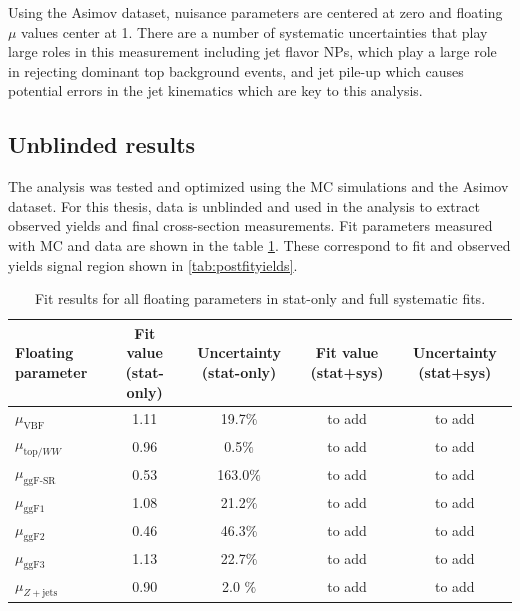 Using the Asimov dataset, nuisance parameters are centered at zero and floating $\mu$ values center at 1. There are a number of systematic uncertainties that play large roles in this measurement including jet flavor NPs, which play a large role in rejecting dominant top background events, and jet pile-up which causes potential errors in the jet kinematics which are key to this analysis.

\subsection{Unblinded results}

The analysis was tested and optimized using the MC simulations and the Asimov dataset. For this thesis, data is unblinded and used in the analysis to extract observed yields and final cross-section measurements. Fit parameters measured with MC and data are shown in the table \ref{tab:datamuresults}. These correspond to fit and observed yields signal region shown in \ref{tab:postfityields}.

\begin{table}[!h]
  \begin{center}
    \begin{tabular}{l|c|c|c|c|}
       Floating parameter & Fit value (stat-only) & Uncertainty (stat-only)    & Fit value (stat+sys) & Uncertainty (stat+sys) \\
      \hline
       $\mu_{\text{VBF}}$ & 1.11 & 19.7$\%$ & to add & to add\\
       $\mu_{\text{top/}WW}$ & 0.96 & 0.5$\%$ & to add & to add\\
       $\mu_{\text{ggF-SR}}$ & 0.53 & 163.0$\%$ & to add & to add \\
       $\mu_{\text{ggF1}}$ & 1.08 & 21.2$\%$ & to add & to add \\
       $\mu_{\text{ggF2}}$ & 0.46 & 46.3$\%$ & to add & to add \\
       $\mu_{\text{ggF3}}$ & 1.13 & 22.7$\%$ & to add & to add \\
       $\mu_{Z+\text{jets}}$& 0.90 & 2.0 $\%$ & to add & to add \\
    \end{tabular}
    \caption{Fit results for all floating parameters in stat-only and full systematic fits.}
    \label{tab:datamuresults}
  \end{center}
\end{table}


